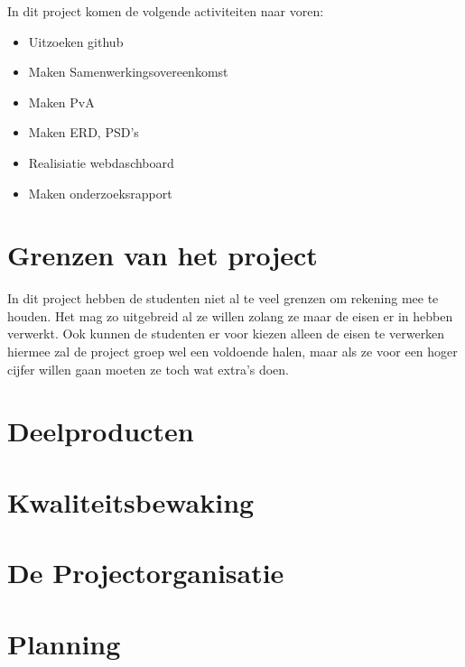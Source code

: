 \documentclass[11pt]{article}
\begin{document}
\begin{flushleft}
	
	In dit project komen de volgende activiteiten naar voren:
	
	
	\begin{itemize}
		
		\item Uitzoeken github
		\item Maken Samenwerkingsovereenkomst
		\item Maken PvA
		\item Maken ERD, PSD's
		\item Realisiatie webdaschboard
		\item Maken onderzoeksrapport
	\end{itemize}
	
\end{flushleft}

	
	

\newpage
\section[Grenzen] {Grenzen van het project}

In dit project hebben de studenten niet al te veel grenzen om rekening mee te houden. Het mag zo uitgebreid al ze willen zolang ze maar de eisen er in hebben verwerkt. Ook kunnen de studenten er voor kiezen alleen de eisen te verwerken hiermee zal de project groep wel een voldoende halen, maar als ze voor een hoger cijfer willen gaan moeten ze toch wat extra's doen. 

\newpage
\section{Deelproducten}
\newpage
\section{Kwaliteitsbewaking}
\newpage
\section{De Projectorganisatie}
\newpage
\section{Planning}
\end{document}
